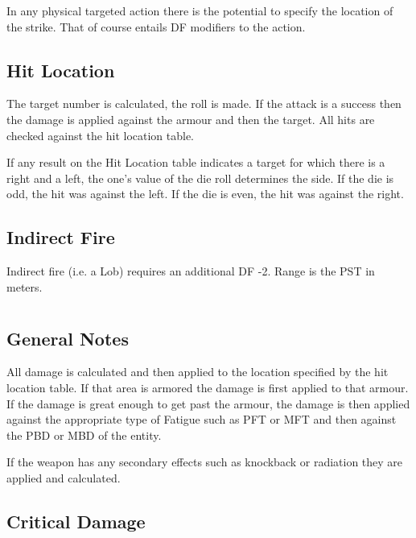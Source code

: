In any physical targeted action there is the potential to specify the
location of the strike. That of course entails DF modifiers to the
action.
\index{}



\subsection{Hit Location}

The target number is calculated, the roll is made. If the attack
is a success then the damage is applied against the armour and then
the target.
All hits are checked against the hit location table.



If any result on the Hit Location table indicates a target for which there
is a right and a left, the one's value of the die roll determines the side.
If the die is odd, the hit was against the left. If the die is even, the hit
was against the right.

\subsection{Indirect Fire}

Indirect fire (i.e. a Lob) requires an additional DF -2. Range is the
PST in meters.

\section{}

\subsection{General Notes}

All damage is calculated and then applied to the location specified
by the hit location table. If that area is armored the damage is
first applied to that armour. If the damage is great enough to get
past the armour, the damage is then applied against the
appropriate type of Fatigue such as PFT or MFT and then against the
PBD or MBD of the entity.

If the weapon has any secondary effects such as knockback or radiation
they are applied and calculated.

\subsection{Critical Damage}

